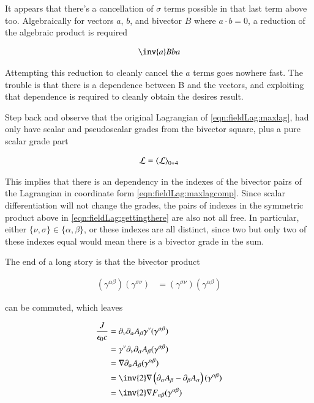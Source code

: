 It appears that there's a cancellation of $\sigma$ terms possible in that last term above too.  Algebraically
for vectors $a$, $b$, and bivector $B$ where $a \cdot b = 0$, a reduction of the algebraic product is required

\begin{align*}
\inv{a} B b a
\end{align*}

Attempting this reduction to cleanly cancel the $a$ terms goes nowhere fast.  The trouble is that there
is a dependence between B and the vectors, and exploiting that dependence is required to cleanly obtain the desires
result.

Step back and observe that the original Lagrangian of \ref{eqn:fieldLag:maxlag}, 
had only have scalar and pseudoscalar grades from the bivector square, plus a pure scalar grade part

\begin{align*}
\mathcal{L} = {\left\langle{{\mathcal{L}}}\right\rangle}_{0+4}
\end{align*}

This implies that there is an dependency in the indexes of the
bivector pairs of the Lagrangian in coordinate form \ref{eqn:fieldLag:maxlagcomp}.
Since scalar differentiation will not change the grades, the pairs
of indexes in the symmetric product above in \ref{eqn:fieldLag:gettingthere} are also not all free.
In particular, either $\{\nu, \sigma\} \in \{\alpha, \beta\}$, or these indexes are all distinct, since two but only two
of these indexes equal would mean there is a bivector grade in the sum.  

The end of a long story is that the bivector product

\begin{align*}
(\gamma^{\alpha\beta}) (\gamma^{\sigma\nu})
&=
(\gamma^{\sigma\nu}) (\gamma^{\alpha\beta})
\end{align*}

can be commuted, which leaves

\begin{align*}
\frac{J}{\epsilon_0 c}
&= \partial_\nu \partial_\alpha A_\beta \gamma^{\nu} (\gamma^{\alpha\beta}) \\
&= \gamma^\nu \partial_\nu \partial_\alpha A_\beta (\gamma^{\alpha\beta}) \\
&= \grad \partial_\alpha A_\beta (\gamma^{\alpha\beta}) \\
&= \inv{2} \grad \left(\partial_\alpha A_\beta - \partial_\beta A_\alpha \right) (\gamma^{\alpha\beta}) \\
&= \inv{2} \grad F_{\alpha\beta} (\gamma^{\alpha\beta}) \\
\end{align*}

